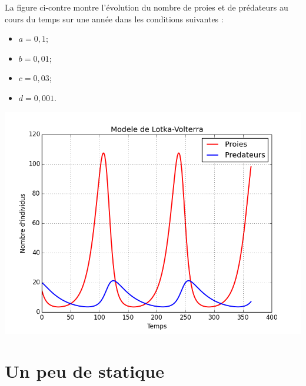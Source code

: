 \documentclass[10pt]{article}
\newif\ifprof
\begin{document}
\ifprof 
\begin{corrige}
\begin{py}
\begin{python}
def run_modele()
    tab_j,tab_u,tab_v=[],[],[]
    nb_jour = 365,i=0
    h=1
    while i<=365:
        tab_j.append(i)
        tab_u.append(fonc_u(i))
        tab_v.append(fonc_v(i))
    return tab_j, tab_u, tab_v
\end{python}
\end{py}
\end{corrige}
\else
\fi

\ifprof
\else

\begin{minipage}[c]{.3\linewidth}
La figure ci-contre montre l'évolution du nombre de proies et de prédateurs au cours du temps sur une année dans les conditions suivantes : 

\begin{itemize}
\item $a=0,1$;
\item $b=0,01$;
\item $c=0,03$;
\item $d=0,001$.
\end{itemize}
\end{minipage} \hfill
\begin{minipage}[c]{.6\linewidth}
\begin{center}
\includegraphics[width=.95\textwidth]{images/figure_1.png}
\end{center}
\end{minipage}
\fi

\section{Un peu de statique}
\end{document}
